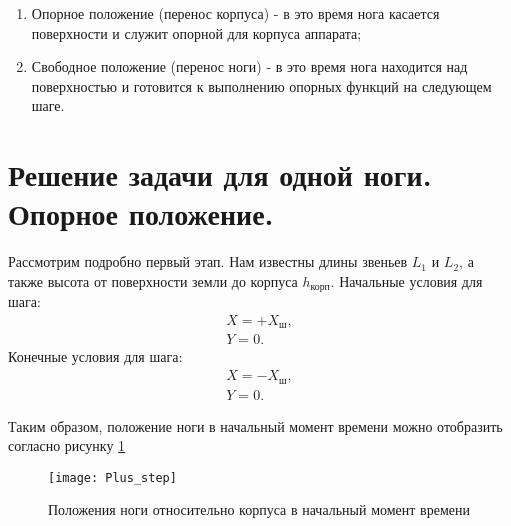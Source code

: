 \begin{enumerate} 
	\item Опорное положение (перенос корпуса) - в это время нога касается поверхности и служит опорной для корпуса аппарата;
	\item Свободное положение (перенос ноги) - в это время нога находится над поверхностью и готовится к выполнению опорных функций на следующем шаге.
\end{enumerate}

\section{Решение задачи для одной ноги. Опорное положение.}\label{C3_2}
Рассмотрим подробно первый этап. Нам известны длины звеньев $L_{1}$ и $L_{2}$, а также высота от поверхности земли до корпуса $h_{\text{корп}}$. 
Начальные условия для шага:
\begin{equation}
	\begin{array}{l}
		X = +X_{\text{ш}},
		\\
		Y = 0.
	\end{array}
\end{equation}
Конечные условия для шага:
\begin{equation}
	\begin{array}{l}
		X = -X_{\text{ш}},
		\\
		Y = 0.
	\end{array}
	\label{gran_step}
\end{equation}

Таким образом, положение ноги в начальный момент времени можно отобразить согласно рисунку \ref{Plus_step}
\newline
\begin{figure}[h]
	\begin{center}
		\texttt{[image: Plus\_step]}
		\caption{Положения ноги относительно корпуса в начальный момент времени}
		\label{Plus_step}
	\end{center}
\end{figure}

